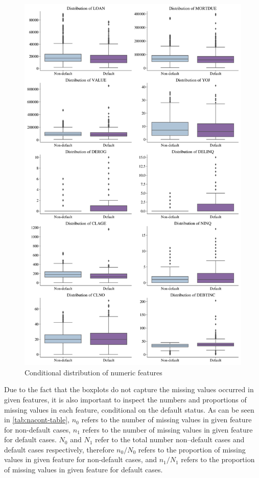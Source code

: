 \begin{figure}[H]
    \centering
    \caption{Conditional distribution of numeric features}\vspace{0.5em}
    \label{fig:boxfeat}
    \includegraphics[width=140mm]{Figures/Continuous_Features_Distribution_Boxplots.jpg}
    \vspace{-1em}
\end{figure}

Due to the fact that the boxplots do not capture the missing values occurred in given features, it is also important to inspect the numbers and proportions of missing values in each feature, conditional on the default status.
As can be seen in \autoref{tab:nacont-table}, $n_0$ refers to the number of missing values in given feature for non-default cases, $n_1$ refers to the number of missing values in given feature for default cases.
$N_0$ and $N_1$ refer to the total number non--default cases and default cases respectively, therefore $n_0/N_0$ refers to the proportion of missing values in given feature for non-default cases, and $n_1/N_1$ refers to the proportion of missing values in given feature for default cases.

